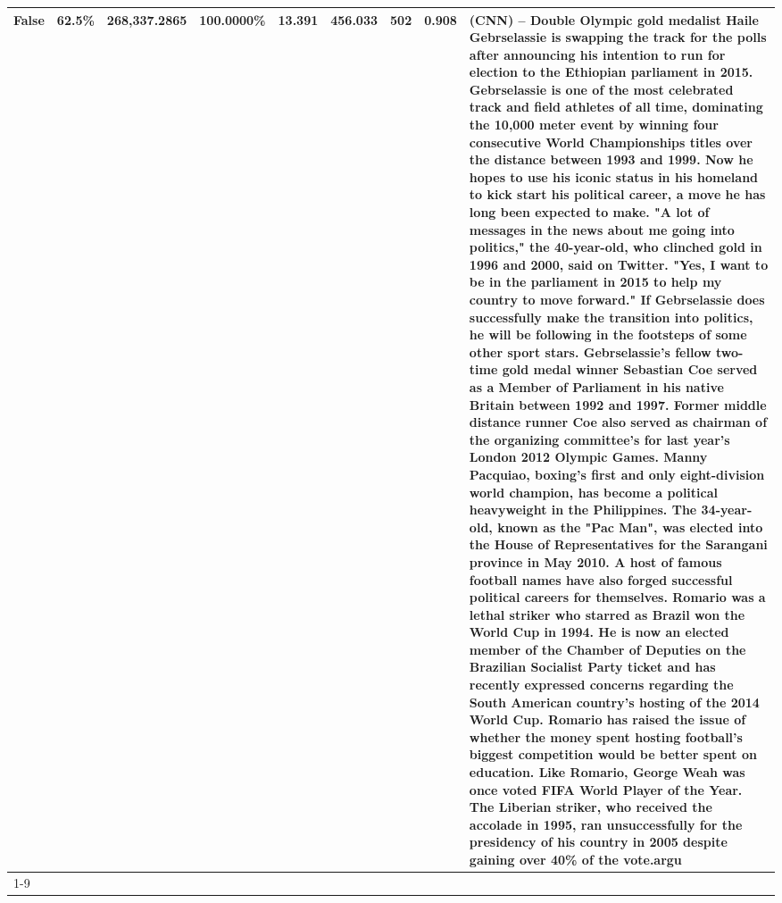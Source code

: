 \begin{table}[H]
{\begin{tabular}{lllrlllll}
False & 62.5\% & \color{red} 268,337.2865 & \bfseries \color{red} 100.0000\% & 13.391 & 456.033 & 502 & 0.908 & (CNN) -- Double Olympic gold medalist Haile Gebrselassie is swapping the track for the polls after announcing his intention to run for election to the Ethiopian parliament in 2015. Gebrselassie is one of the most celebrated track and field athletes of all time, dominating the 10,000 meter event by winning four consecutive World Championships titles over the distance between 1993 and 1999. Now he hopes to use his iconic status in his homeland to kick start his political career, a move he has long been expected to make. "A lot of messages in the news about me going into politics," the 40-year-old, who clinched gold in 1996 and 2000, said on Twitter. "Yes, I want to be in the parliament in 2015 to help my country to move forward." If Gebrselassie does successfully make the transition into politics, he will be following in the footsteps of some other sport stars. Gebrselassie's fellow two-time gold medal winner Sebastian Coe served as a Member of Parliament in his native Britain between 1992 and 1997. Former middle distance runner Coe also served as chairman of the organizing committee's for last year's London 2012 Olympic Games. Manny Pacquiao, boxing's first and only eight-division world champion, has become a political heavyweight in the Philippines. The 34-year-old, known as the "Pac Man", was elected into the House of Representatives for the Sarangani province in May 2010. A host of famous football names have also forged successful political careers for themselves. Romario was a lethal striker who starred as Brazil won the World Cup in 1994. He is now an elected member of the Chamber of Deputies on the Brazilian Socialist Party ticket and has recently expressed concerns regarding the South American country's hosting of the 2014 World Cup. Romario has raised the issue of whether the money spent hosting football's biggest competition would be better spent on education. Like Romario, George Weah was once voted FIFA World Player of the Year. The Liberian striker, who received the accolade in 1995, ran unsuccessfully for the presidency of his country in 2005 despite gaining over 40\% of the vote.argu \\
\cline{1-9}

\end{tabular}}
\end{table}
